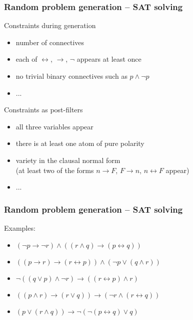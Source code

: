 \documentclass[xcolor={table}]{beamer}
\newcommand{\limpl}{\rightarrow}
\newcommand{\liff}{\leftrightarrow}
\begin{document}
\begin{frame}
    \frametitle{Random problem generation -- SAT solving}

    Constraints during generation
    \begin{itemize}
        \item
            number of connectives
        \item
            each of $\liff$, $\limpl$, $\lnot$ appears at least once
        \item
            no trivial binary connectives such as $p \land \lnot p$
        \item
            ...
    \end{itemize}

    \bigskip
    \pause

    Constraints as post-filters
    \begin{itemize}
        \item
            all three variables appear
        \item
            there is at least one atom of pure polarity
        \item
            variety in the clausal normal form \\
            (at least two of the forms $n \limpl F$, $F \limpl n$, $n \liff F$ appear)
        \item
            ...
    \end{itemize}
\end{frame}

\begin{frame}
    \frametitle{Random problem generation -- SAT solving}

    Examples:
    \begin{itemize}
        \item $ ( \lnot p \rightarrow \lnot r ) \land ( ( r \land q ) \rightarrow ( p \leftrightarrow q ) ) $
        \item $ ( ( p \rightarrow r ) \rightarrow ( r \leftrightarrow p ) ) \land ( \lnot p \lor ( q \land r ) ) $
        \item $ \lnot ( ( q \lor p ) \land \lnot r ) \rightarrow ( ( r \leftrightarrow p ) \land r ) $
        \item $ ( ( p \land r ) \rightarrow ( r \lor q ) ) \rightarrow ( \lnot r \land ( r \leftrightarrow q ) ) $
        \item $ ( p \lor ( r \land q ) ) \rightarrow \lnot ( \lnot ( p \leftrightarrow q ) \lor q ) $
    \end{itemize}
\end{frame}
\end{document}
